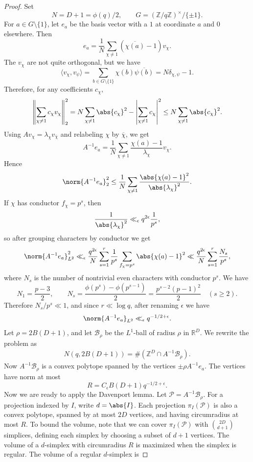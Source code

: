 \documentclass{article}
\newcommand{\bR}{\mathbb{R}}
\newcommand{\bZ}{\mathbb{Z}}
\def\cB{ {\mathcal B} }
\def\cP{{\mathcal P}}
\begin{document}
\begin{proof}
Set
\[
N = D+1 = \phi(q)/2,
\qquad
G = (\bZ/q\bZ)^\times/\{\pm 1\}.
\]
For $a \in G \setminus \{1\}$, let $e_a$ be the basis vector with a $1$ at coordinate $a$ and $0$ elsewhere. Then
\[
e_a
=
\frac{1}{N}
\sum_{\chi \neq 1}
\left(\overline{\chi(a)}-1\right)v_\chi.
\]
The $v_\chi$ are not quite orthogonal, but we have
\[
\langle v_\chi,v_\psi\rangle
=
\sum_{b \in G \setminus \{1\}}\chi(b)\overline{\psi(b)}
=
N\delta_{\chi,\psi}-1.
\]
Therefore, for any coefficients $c_\chi$,
\[
\left\|\sum_{\chi \neq 1} c_\chi v_\chi\right\|_{2}^2
=
N\sum_{\chi \neq 1}\abs{c_\chi}^2
-
\left|\sum_{\chi \neq 1}c_\chi\right|^2
\leq
N\sum_{\chi \neq 1}\abs{c_\chi}^2.
\]
Using $A v_\chi=\lambda_\chi v_{\overline{\chi}}$ and relabeling $\chi$ by $\overline{\chi}$, we get
\[
A^{-1}e_a
=
\frac{1}{N}
\sum_{\chi \neq 1}
\frac{\chi(a)-1}{\lambda_\chi}v_\chi.
\]
Hence
\[
\norm{A^{-1} e_a}_{2}^2
\leq
\frac{1}{N}
\sum_{\chi \neq 1}
\frac{\abs{\chi(a)-1}^2}{\abs{\lambda_\chi}^2}.
\]
If $\chi$ has conductor $f_\chi = p^s$, then
\[
\frac{1}{\abs{\lambda_\chi}^2}
\ll_\epsilon
q^{2\epsilon}\frac{1}{p^s},
\]
so after grouping characters by conductor we get
\[
\norm{A^{-1} e_a}_{L^2}^2
\ll_\epsilon
\frac{q^{2\epsilon}}{N}
\sum_{s=1}^r
\frac{1}{p^s}
\sum_{f_\chi = p^s}
\abs{\chi(a)-1}^2
\ll
\frac{q^{2\epsilon}}{N}
\sum_{s=1}^r \frac{N_s}{p^s},
\]
where $N_s$ is the number of nontrivial even characters with conductor $p^s$. We have
\[
N_1 = \frac{p-3}{2},
\qquad
N_s = \frac{\phi(p^s)-\phi(p^{s-1})}{2}
=
\frac{p^{s-2}(p-1)^2}{2}
\quad (s \geq 2).
\]
Therefore $N_s/p^s \ll 1$, and since $r \ll \log q$, after renaming $\epsilon$ we have
\[
\norm{A^{-1} e_a}_{L^2} \ll_\epsilon q^{-1/2+\epsilon}.
\]
Let $\rho = 2B(D+1)$, and let $\cB_\rho$ be the $L^1$-ball of radius $\rho$ in $\bR^D$. We rewrite the problem as
\begin{align*}
N(q,2B(D+1)) = \#(\bZ^D \cap A^{-1} \cB_\rho).
\end{align*}
Now $A^{-1} \cB_\rho$ is a convex polytope spanned by the vertices $\pm \rho A^{-1} e_a$. The vertices have norm at most
\[
R = C_\epsilon B (D+1) q^{-1/2+\epsilon}.
\]
Now we are ready to apply the Davenport lemma. Let $\cP=A^{-1}\cB_\rho$. For a projection indexed by $I$, write $d = \abs{I}$. Each projection $\pi_I(\cP)$ is also a convex polytope, spanned by at most $2D$ vertices, and having circumradius at most $R$. To bound the volume, note that we can cover $\pi_I(\cP)$ with $\binom{2D}{d+1}$ simplices, defining each simplex by choosing a subset of $d+1$ vertices. The volume of a $d$-simplex with circumradius $R$ is maximized when the simplex is regular. The volume of a regular $d$-simplex is

\end{proof}
\end{document}
